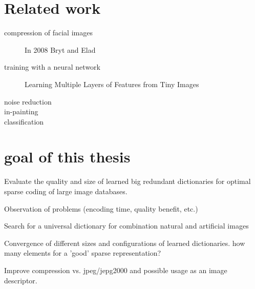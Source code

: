 \section{Related work}
\begin{description}
\item[compression of facial images] In 2008 Bryt and Elad \cite{Bryt2008} 
\item[training with a neural network]
Learning Multiple Layers of Features from Tiny Images \cite{Krizhevsky2009}
\item[noise reduction]
\item[in-painting]
\item[classification] 
\end{description}



\section{goal of this thesis}
Evaluate the quality and size of learned big redundant dictionaries for 
optimal sparse coding of large image databases.

Observation of problems (encoding time, quality benefit, etc.)

Search for a universal dictionary for combination natural and artificial images
 
Convergence of different sizes and configurations of learned dictionaries.
how many elements for a 'good' sparse representation?



Improve compression vs. jpeg/jepg2000 and possible usage as an image descriptor.
